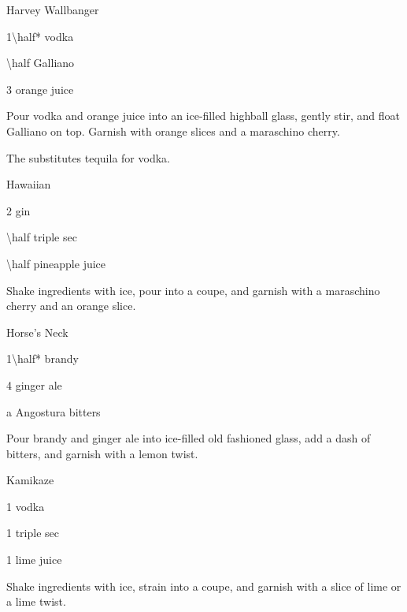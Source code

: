 \begin{Cocktail}{Harvey Wallbanger}
  \begin{Ingredients}
  \item \SI{1\half*}{\oz} vodka
  \item \SI{\half}{\oz} Galliano
  \item \SI{3}{\oz} orange juice
  \end{Ingredients}
  
  \begin{Instructions}
	Pour vodka and orange juice into an ice-filled highball glass, gently stir, and float Galliano on top.  Garnish with orange slices and a maraschino cherry.
	
	The  substitutes tequila for vodka.
  \end{Instructions}
\end{Cocktail}

\begin{Cocktail}{Hawaiian}
  \begin{Ingredients}
  \item \SI{2}{\oz} gin
  \item \SI{\half}{\oz} triple sec
  \item \SI{\half}{\oz} pineapple juice
  \end{Ingredients}
  
  \begin{Instructions}
	Shake ingredients with ice, pour into a coupe, and garnish with a maraschino cherry and an orange slice.
  \end{Instructions}
\end{Cocktail}

\begin{Cocktail}{Horse's Neck}
  \begin{Ingredients}
  \item \SI{1\half*}{\oz} brandy
  \item \SI{4}{\oz} ginger ale
  \item a \si{\dash} Angostura bitters
  \end{Ingredients}
  
  \begin{Instructions}
	Pour brandy and ginger ale into ice-filled old fashioned glass, add a dash of bitters, and garnish with a lemon twist.
  \end{Instructions}
\end{Cocktail}

\begin{Cocktail}{Kamikaze}
  \begin{Ingredients}
  \item \SI{1}{\oz} vodka
  \item \SI{1}{\oz} triple sec
  \item \SI{1}{\oz} lime juice
  \end{Ingredients}
  
  \begin{Instructions}
	Shake ingredients with ice, strain into a coupe, and garnish with a slice of lime or a lime twist.
  \end{Instructions}
\end{Cocktail}

